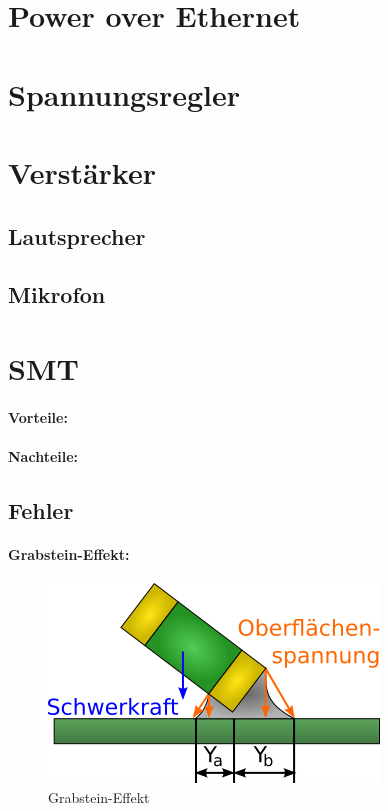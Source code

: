 \wip
\section{Power over Ethernet}
\section{Spannungsregler}
\section{Verstärker}
\subsection{Lautsprecher}
\subsection{Mikrofon}
\section{SMT}
\paragraph{Vorteile:}
\paragraph{Nachteile:}
\subsection{Fehler}
\paragraph{Grabstein-Effekt:} %
\begin{figure}[H]
	\centering
	\includegraphics[width=.5\linewidth]{images/technische_grundlagen/grabsteinEffekt.png}%
	\caption{Grabstein-Effekt}
\end{figure}


